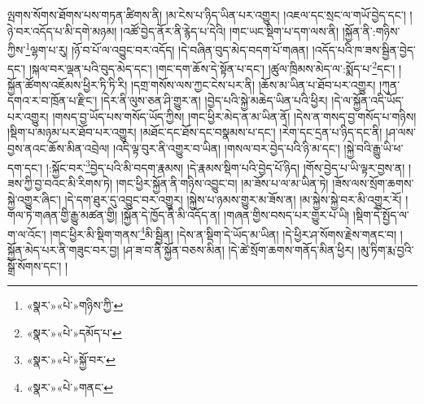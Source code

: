 ལྤགས་སོགས་ཐོགས་པས་གཏན་ཚིགས་ནི། །མ་ངེས་པ་ཉིད་ཡིན་པར་འགྱུར། །འཇལ་དང་སྲང་ལ་གཡོ་བྱེད་དང་། །ཉེ་བར་འདོད་པ་མི་དགེ་མཉམ། །འཚོ་བྱེད་ནོར་ནི་རྙེད་པ་དེའི། །གང་ཡང་སྡིག་པ་དག་ལས་ནི། །སྐྱོན་ནི་:གཉིས་ཀྱིས་\footnote{«སྣར་»«པེ་»གཉིས་ཀྱི་}ལྷག་པ་རུ། །ཉོ་བ་པོ་ལ་འབྱུང་བར་འདོད། །དེ་བཞིན་བུད་མེད་བདག་པོ་གཞན། །འདོད་པའི་ཁ་ཟས་སྦྱིན་བྱེད་དང་། །སྐལ་བར་ལྡན་པའི་བུད་མེད་དང་། །གང་དག་ཆོས་དེ་སྟོན་པ་དང་། །ཚུལ་ཁྲིམས་མེད་ལ་:སྨོད་པ་\footnote{«སྣར་»«པེ་»དམོད་པ་}དང་། །སྐྱོན་ཚོགས་འཇོམས་ཕྱིར་ཏི་ཏི་རི། །དགྲ་གསོས་ལས་ཀྱང་ངེས་པར་ནི། །ཆོས་མ་ཡིན་པ་ཐོབ་པར་འགྱུར། །ཀུན་དགའ་ར་བ་ཁྲོན་པ་རྫིང་། །དེར་ནི་ལུས་ཅན་ཤི་གྱུར་ན། །བྱེད་པའི་སྐྱེ་མཆེད་ཡིན་པའི་ཕྱིར། །དེ་ལ་སྐྱོན་འདི་ཡོད་པར་འགྱུར། །གསད་བྱ་ཡོད་པས་གསོད་ཡོད་ཀྱིས། །གང་ཕྱིར་མེད་ན་མ་ཡིན་ནོ། །དེས་ན་གསད་བྱ་གསོད་པ་གཉིས། །སྡིག་པ་མཉམ་པར་ཐོབ་པར་འགྱུར། །མཐོང་དང་ཐོས་དང་བསྣམས་པ་དང་། །རེག་དང་དྲན་པ་ཉིད་དང་ནི། །ཤ་ལས་བྱས་ནའང་ཆོས་མིན་འབྲེལ། །འདི་ལྟ་བུར་ནི་འགྱུར་བ་ཡིན། །གསལ་བར་བྱེད་པའི་ཉི་མ་དང་། །སྐྱེ་བའི་རྒྱུ་ཡི་ཕ་དག་དང་། །:སྐྱོང་བར་\footnote{«སྣར་»«པེ་»སྐྱོ་བར་}བྱེད་པའི་མི་བདག་རྣམས། །དེ་རྣམས་སྡིག་པའི་བྱེད་པོ་ཉིད། །གོས་བྱེད་པ་ཡི་ལྟར་བྱས་ན། །ཟས་ཀྱི་བྱ་བའང་མི་རིགས་ཏེ། །གང་ཕྱིར་སྐྱོན་ནི་གཉིས་འབྱུང་བ། །མ་ཟོས་པ་ལ་མ་ཡིན་ཏེ། །ཟོས་ལས་སྲོག་ཆགས་སྐྱེ་འགྱུར་ཞིང་། །དེ་དག་ཐུར་དུ་འབྱུང་བར་འགྱུར། །སྐྱེས་པ་ཉམས་གྱུར་མ་ཟོས་ན། །མ་སྐྱེས་སྐྱེ་བར་མི་འགྱུར་རོ། །གལ་ཏེ་གཞན་གྱི་རྒྱུ་མཚན་གྱི། །སྐྱོན་དེ་ཁྱོད་ནི་མི་འདོད་ན། །གཞན་གྱིས་བསད་པར་གྱུར་པ་ཡི། །སྡིག་དེ་སྤྱོད་ལ་ག་ལ་འོང་། །གང་ཕྱིར་མི་སྡིག་གནས་\footnote{«སྣར་»«པེ་»གནང་}མི་སྦྱིན། །དེས་ན་སྡིག་དེ་ཡོད་མ་ཡིན། །དེ་ཕྱིར་ཤ་སོགས་རྗེས་གནང་བ། །སྐྱོན་མེད་པར་ནི་གཟུང་བར་བྱ། །ཤ་ཟ་བ་ནི་སྐྱོན་བཅས་མིན། །དེ་ཚེ་སྲོག་ཆགས་གནོད་མིན་ཕྱིར། །མུ་ཏིག་རྨ་བྱའི་སྒྲོ་སོགས་དང་། །
